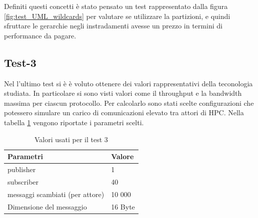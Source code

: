 Definiti questi concetti è stato pensato un test rappresentato dalla figura \ref{fig:test_UML_wildcards} per valutare se utilizzare la partizioni, e quindi sfruttare le gerarchie negli instradamenti avesse un prezzo in termini di performance da pagare.  


\subsection{Test-3}
Nel l'ultimo test si è è voluto ottenere dei valori rappresentativi della teconologia studiata. In particolare si sono visti valori come il throughput e la bandwidth massima per ciascun protocollo.
Per calcolarlo sono stati scelte configurazioni che potessero simulare un carico di comunicazioni elevato tra attori di HPC. Nella tabella \ref{table:test3} vengono riportate i parametri scelti.

\begin{table}[H]
    \begin{center}
    \begin{tabular}{l|l}
        \hline
        \textbf{Parametri} & \textbf{Valore}\\
        \hline
        [\#] publisher & 1 \\
        \hline
        [\#] subscriber & 40 \\
        \hline
        [\#] messaggi scambiati (per attore) & 10 000 \\
        \hline
        Dimensione del messaggio & 16 Byte \\
        \hline
    \end{tabular}
    \end{center}
    \caption{Valori usati per il test 3}\label{table:test3}
    \end{table}
    
